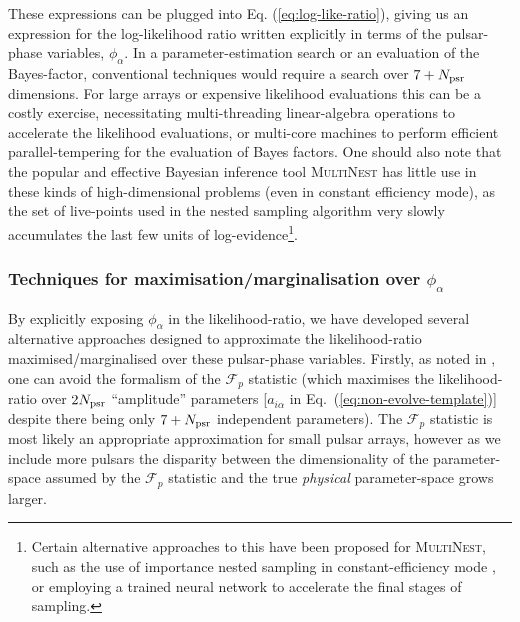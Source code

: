 \documentclass[prd,showpacs,nofootinbib]{revtex4}
\begin{document}
These expressions can be plugged into Eq. (\ref{eq:log-like-ratio}), giving us an expression for the log-likelihood ratio written explicitly in terms of the pulsar-phase variables, $\phi_{\alpha}$. In a parameter-estimation search or an evaluation of the Bayes-factor, conventional techniques would require a search over $7+N_{\rm psr}$ dimensions. For large arrays or expensive likelihood evaluations this can be a costly exercise, necessitating multi-threading linear-algebra operations to accelerate the likelihood evaluations, or multi-core machines to perform efficient parallel-tempering for the evaluation of Bayes factors. One should also note that the popular and effective Bayesian inference tool \textsc{MultiNest} has little use in these kinds of high-dimensional problems (even in constant efficiency mode), as the set of live-points used in the nested sampling algorithm very slowly accumulates the last few units of log-evidence\footnote{Certain alternative approaches to this have been proposed for \textsc{MultiNest}, such as the use of importance nested sampling in constant-efficiency mode \citep{INS_Multinest}, or employing a trained neural network \citep{skynet} to accelerate the final stages of sampling.}.

\subsubsection{Techniques for maximisation/marginalisation over $\phi_{\alpha}$}

By explicitly exposing $\phi_{\alpha}$ in the likelihood-ratio, we have developed several alternative approaches designed to approximate the likelihood-ratio maximised/marginalised over these pulsar-phase variables. Firstly, as noted in \citet{ellis_optimal}, one can avoid the formalism of the $\mathcal{F}_p$ statistic (which maximises the likelihood-ratio over $2N_{\rm psr}$ ``amplitude'' parameters [$a_{i\alpha}$ in Eq.\ (\ref{eq:non-evolve-template})] despite there being only $7+N_{\rm psr}$ independent parameters). The $\mathcal{F}_p$ statistic is most likely an appropriate approximation for small pulsar arrays, however as we include more pulsars the disparity between the dimensionality of the parameter-space assumed by the $\mathcal{F}_p$ statistic and the true {\it physical} parameter-space grows larger.

\end{document}
